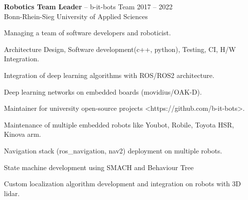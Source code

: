 \documentclass{article}
\newcommand{\employer}[4]{{
\vspace*{2pt}%
\textbf{#1} #2 \hfill #3\\ #4 \vspace*{2pt}}
}
\renewcommand{\labelitemii}{
	\raisebox{0.3ex}{\tiny\textbullet}
}
\newenvironment{bullet-list-minor}{
\begin{list}{\labelitemii}{\setlength\leftmargin{15pt} 
\topsep 0pt \itemsep -2pt}}{\vspace*{4pt}\end{list}
}
\begin{document}
    \employer{Robotics Team Leader}{-- b-it-bots Team}{2017 -- 2022}
    {Bonn-Rhein-Sieg University of Applied Sciences}
	\begin{bullet-list-minor}
		\item Managing a team of software developers and roboticist.
		\item Architecture Design, Software development(c++, python), Testing, CI, H/W Integration.
		\item Integration of deep learning algorithms with ROS/ROS2 architecture.
		\item Deep learning networks on embedded boards (movidius/OAK-D).
		\item Maintainer for university open-source projects <https://github.com/b-it-bots>.
		\item Maintenance of multiple embedded robots like Youbot, Robile, Toyota HSR, Kinova arm.
		\item Navigation stack (ros\_navigation, nav2) deployment on multiple robots.
		\item State machine development using SMACH and Behaviour Tree
		\item Custom localization algorithm development and integration on robots with 3D lidar.
    \end{bullet-list-minor}
    
    
\end{document}
